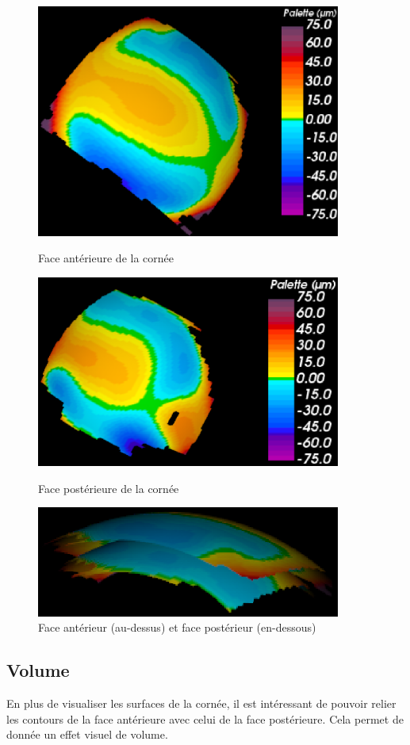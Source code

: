 \documentclass[a4paper,12pt]{article}
\begin{document}
\begin{figure}[h!]
	\centering
	\includegraphics[width=10cm]{AntScalarBar.eps} 
	\caption{Face antérieure de la cornée}
	\label{AntScalarBar}
	\includegraphics[width=10cm]{PostScalarBar.eps} 
	\caption{Face postérieure de la cornée}
	\label{PostScalarBar}
	\includegraphics[width=10cm]{FaceAntPost.eps} 
	\caption{Face antérieur (au-dessus) et face postérieur (en-dessous)}
	\label{FaceAntPost}
\end{figure}
	

	\subsection{Volume}
En plus de visualiser les surfaces de la cornée, il est intéressant de pouvoir relier les contours de la face antérieure avec celui de la face postérieure. Cela permet de donnée un effet visuel de volume. 
\end{document}
